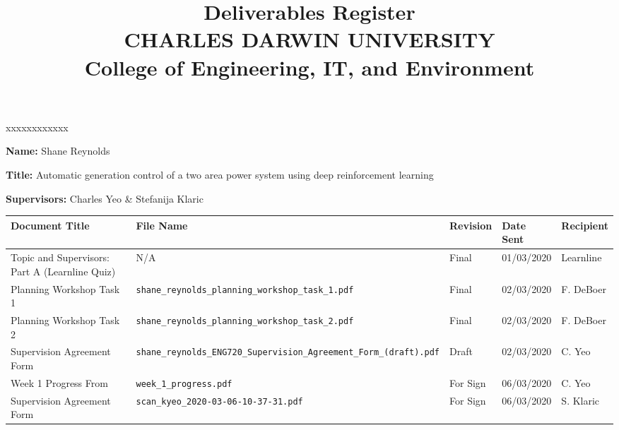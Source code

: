 \documentclass[10pt, landscape]{article}
\title{	
		Deliverables Register\\
		CHARLES DARWIN UNIVERSITY\\
		College of Engineering, IT, and Environment
	  }
\author{}
\date{}
\begin{document}
	
	\maketitle
	
	\begin{namelist}{xxxxxxxxxxxx}
		\item[{\bf Name:}]
			Shane Reynolds
		\item[{\bf Title:}]
			Automatic generation control of a two area power system using deep reinforcement learning
		\item[{\bf Supervisors:}]
			Charles Yeo \& Stefanija Klaric
	\end{namelist}
	
	\small
	\begin{tabular}{p{7cm}p{10cm}p{1.5cm}p{2cm}p{2cm}}
	\toprule
	\textbf{Document Title}							& \textbf{File Name}				& \textbf{Revision} & \textbf{Date Sent} 	& \textbf{Recipient} \\
	\midrule
	Topic and Supervisors: Part A (Learnline Quiz)	& N/A								& Final 			& 01/03/2020		 	& Learnline\\
	Planning Workshop Task 1						& \verb|shane_reynolds_planning_workshop_task_1.pdf|						& Final				& 02/03/2020		 	& F. DeBoer\\
	Planning Workshop Task 2						& \verb|shane_reynolds_planning_workshop_task_2.pdf|						& Final				& 02/03/2020			& F. DeBoer\\
	Supervision Agreement Form						& \verb|shane_reynolds_ENG720_Supervision_Agreement_Form_(draft).pdf|						& Draft				& 02/03/2020			& C. Yeo\\
	Week 1 Progress From							& \verb|week_1_progress.pdf|									& 				For Sign			& 06/03/2020			& C. Yeo\\
	Supervision Agreement Form						& \verb|scan_kyeo_2020-03-06-10-37-31.pdf|						& 				For Sign			& 06/03/2020			& S. Klaric\\
	\bottomrule
	\end{tabular}
\end{document}
